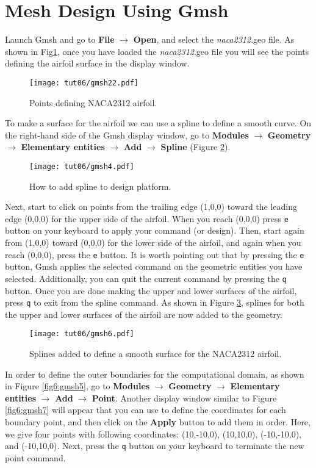 \section{Mesh Design Using Gmsh}
Launch Gmsh and go to \textbf{File} $\rightarrow$ \textbf{Open}, and select the \textit{naca2312}.geo file. As shown in Fig\ref{fig6:gmsh22}, once you have loaded the \textit{naca2312}.geo file you will see the points defining the airfoil surface in the display window.
\begin{figure}[htbp]
    \centering
    \texttt{[image: tut06/gmsh22.pdf]}
    \caption{Points defining NACA2312 airfoil.}
    \label{fig6:gmsh22}
\end{figure}
To make a surface for the airfoil we can use a spline to define a smooth curve. On the right-hand side of the Gmsh display window, go to \textbf{Modules} $\rightarrow$ \textbf{Geometry} $\rightarrow$ \textbf{Elementary entities} $\rightarrow$ \textbf{Add} $\rightarrow$ \textbf{Spline} (Figure \ref{fig6:gmsh4}).
\begin{figure}[htbp]
    \centering
    \texttt{[image: tut06/gmsh4.pdf]}
    \caption{How to add spline to design platform.}
    \label{fig6:gmsh4}
\end{figure}
Next, start to click on points from the trailing edge (1,0,0) toward the leading edge (0,0,0) for the upper side of the airfoil. When you reach (0,0,0) press \texttt{e} button on your keyboard to apply your command (or design). Then, start again from (1,0,0) toward (0,0,0) for the lower side of the airfoil, and again when you reach (0,0,0), press the \texttt{e} button. It is worth pointing out that by pressing the \texttt{e} button, Gmsh applies the selected command on the geometric entities you have selected. Additionally, you can quit the current command by pressing the \texttt{q} button. Once you are done making the upper and lower surfaces of the airfoil, press \texttt{q} to exit from the spline command. As shown in Figure \ref{fig6:gmsh6}, splines for both the upper and lower surfaces of the airfoil are now added to the geometry.
\begin{figure}[htbp]
    \centering
    \texttt{[image: tut06/gmsh6.pdf]}
    \caption{Splines added to define a smooth surface for the NACA2312 airfoil.}
    \label{fig6:gmsh6}
\end{figure}
In order to define the outer boundaries for the computational domain, as shown in Figure \ref{fig6:gmsh5}, go to \textbf{Modules} $\rightarrow$ \textbf{Geometry} $\rightarrow$ \textbf{Elementary entities} $\rightarrow$ \textbf{Add} $\rightarrow$ \textbf{Point}. Another display window similar to Figure \ref{fig6:gmsh7} will appear that you can use to define the coordinates for each boundary point, and then click on the \textbf{Apply} button to add them in order. Here, we give four points with following coordinates: (10,-10,0), (10,10,0), (-10,-10,0), and (-10,10,0). Next, press the \texttt{q} button on your keyboard to terminate the new point command.
